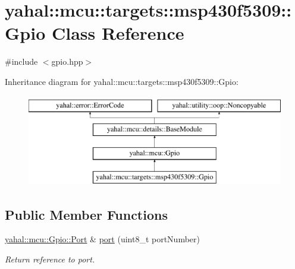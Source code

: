 \hypertarget{classyahal_1_1mcu_1_1targets_1_1msp430f5309_1_1_gpio}{}\section{yahal\+:\+:mcu\+:\+:targets\+:\+:msp430f5309\+:\+:Gpio Class Reference}
\label{classyahal_1_1mcu_1_1targets_1_1msp430f5309_1_1_gpio}


\begin{DoxyVerb}\end{DoxyVerb}
  




{\ttfamily \#include $<$gpio.\+hpp$>$}

Inheritance diagram for yahal\+:\+:mcu\+:\+:targets\+:\+:msp430f5309\+:\+:Gpio\+:\begin{figure}[H]
\begin{center}
\leavevmode
\includegraphics[height=4.000000cm]{classyahal_1_1mcu_1_1targets_1_1msp430f5309_1_1_gpio}
\end{center}
\end{figure}
\subsection*{Public Member Functions}
\begin{DoxyCompactItemize}
\item 
\hypertarget{classyahal_1_1mcu_1_1targets_1_1msp430f5309_1_1_gpio_a0a1b6223b22432357fbca9fe1732ed9c}{}\hyperlink{classyahal_1_1mcu_1_1_gpio_1_1_port}{yahal\+::mcu\+::\+Gpio\+::\+Port} \& \hyperlink{classyahal_1_1mcu_1_1targets_1_1msp430f5309_1_1_gpio_a0a1b6223b22432357fbca9fe1732ed9c}{port} (uint8\+\_\+t port\+Number)\label{classyahal_1_1mcu_1_1targets_1_1msp430f5309_1_1_gpio_a0a1b6223b22432357fbca9fe1732ed9c}

\begin{DoxyCompactList}\small\item\em Return reference to port. \end{DoxyCompactList}\end{DoxyCompactItemize}
